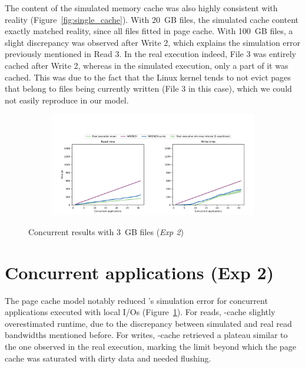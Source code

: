 The content of the simulated memory cache was also highly
consistent with reality (Figure~\ref{fig:single_cache}). With 20~GB
files, the simulated cache content exactly matched reality, since
all files fitted in page cache. With 100~GB files, a slight
discrepancy was observed after Write 2, which explains the
simulation error previously mentioned in Read 3. In the real
execution indeed, File 3 was entirely cached after Write 2, whereas
in the simulated execution, only a part of it was cached. This was
due to the fact that the Linux kernel tends to not evict pages that
belong to files being currently written (File 3 in this case),
which we could not easily reproduce in our model.

\begin{figure}
    \begin{subfigure}{\linewidth}
        \centering
        \includegraphics[width=\linewidth]{result/multi/figures/multi_local.pdf}
    \end{subfigure}
    \caption{Concurrent results with 3~GB files (\textit{Exp 2})}
    \label{fig:multi_local}
\end{figure}

\section{Concurrent applications (Exp 2)}

The page cache model notably reduced \wrench's simulation error
for concurrent applications executed with local I/Os
(Figure~\ref{fig:multi_local}). For reads, \wrench-cache
slightly overestimated runtime, due to the discrepancy between
simulated and real read bandwidths mentioned before. 
For writes, \wrench-cache
retrieved a plateau similar to the one observed in the real
execution, marking the limit beyond which the page cache was
saturated with dirty data and needed flushing.

